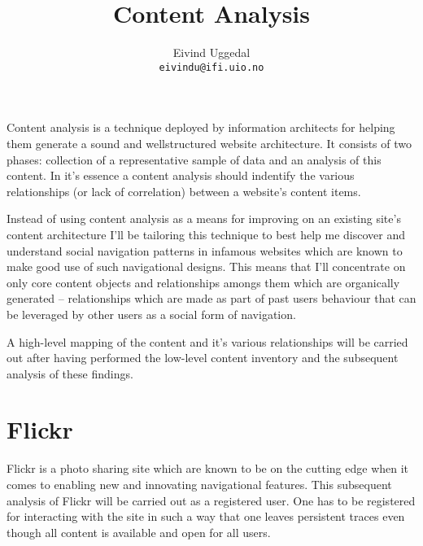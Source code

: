\documentclass[12pt,a4paper]{article}
\title{Content Analysis}
\author{Eivind Uggedal\\
        \texttt{eivindu@ifi.uio.no}}
\date{}
\begin{document}
\maketitle{}

Content analysis is a technique deployed by information architects for helping
them generate a sound and wellstructured website architecture. It consists of
two phases: collection of a representative sample of data and an analysis of
this content. In it's essence a content analysis should indentify the various
relationships (or lack of correlation) between a website's content items.

Instead of using content analysis as a means for improving on an existing
site's content architecture I'll be tailoring this technique to best help me
discover and understand social navigation patterns in infamous websites which
are known to make good use of such navigational designs. This means that I'll
concentrate on only core content objects and relationships amongs them
which are organically generated -- relationships which are made as part of
past users behaviour that can be leveraged by other users as a social form
of navigation.

A high-level mapping of the content and it's various relationships
will be carried out after having performed the low-level content inventory
and the subsequent analysis of these findings.

\section{Flickr}

Flickr is a photo sharing site which are known to be on the cutting edge when
it comes to enabling new and innovating navigational features. This subsequent
analysis of Flickr will be carried out as a registered user. One has to be
registered for interacting with the site in such a way that one leaves
persistent traces even though all content is available and open for all users.
\end{document}
